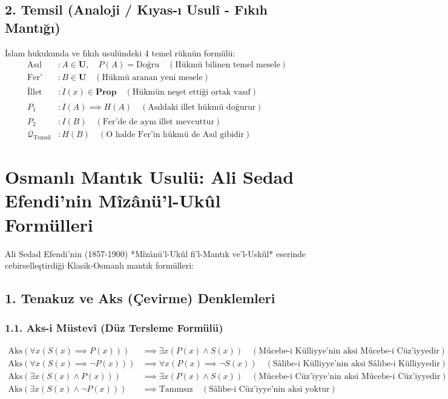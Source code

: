\documentclass[11pt, a4paper]{article}
\begin{document}
\subsection{2. Temsil (Analoji / Kıyas-ı Usulî - Fıkıh Mantığı)}
İslam hukukunda ve fıkıh usulündeki 4 temel rüknün formülü:
\begin{align}
\text{Asıl} &: A \in \mathbf{U}, \quad P(A) = \text{Doğru} \quad (\text{Hükmü bilinen temel mesele}) \\
\text{Fer'} &: B \in \mathbf{U} \quad (\text{Hükmü aranan yeni mesele}) \\
\text{İllet} &: \dot{I}(x) \in \mathbf{Prop} \quad (\text{Hükmün neşet ettiği ortak vasıf}) \\
P_1 &: \dot{I}(A) \implies H(A) \quad (\text{Asıldaki illet hükmü doğurur}) \\
P_2 &: \dot{I}(B) \quad (\text{Fer'de de aynı illet mevcuttur}) \\
\mathcal{Q}_{\text{Temsil}} &: H(B) \quad (\text{O halde Fer'in hükmü de Asıl gibidir})
\end{align}

\section{Osmanlı Mantık Usulü: Ali Sedad Efendi'nin Mîzânü'l-Ukûl Formülleri}

Ali Sedad Efendi'nin (1857-1900) *Mîzânü'l-Ukûl fi'l-Mantık ve'l-Uskûl* eserinde cebirselleştirdiği Klasik-Osmanlı mantık formülleri:

\subsection{1. Tenakuz ve Aks (Çevirme) Denklemleri}

\subsubsection{1.1. Aks-i Müstevî (Düz Tersleme Formülü)}
\begin{align}
\text{Aks}(\forall x (S(x) \implies P(x))) &\implies \exists x (P(x) \land S(x)) \quad (\text{Mûcebe-i Külliyye'nin aksi Mûcebe-i Cüz'iyyedir}) \\
\text{Aks}(\forall x (S(x) \implies \neg P(x))) &\implies \forall x (P(x) \implies \neg S(x)) \quad (\text{Sâlibe-i Külliyye'nin aksi Sâlibe-i Külliyyedir}) \\
\text{Aks}(\exists x (S(x) \land P(x))) &\implies \exists x (P(x) \land S(x)) \quad (\text{Mûcebe-i Cüz'iyye'nin aksi Mûcebe-i Cüz'iyyedir}) \\
\text{Aks}(\exists x (S(x) \land \neg P(x))) &\implies \text{Tanımsız} \quad (\text{Sâlibe-i Cüz'iyye'nin aksi yoktur})
\end{align}
\end{document}
